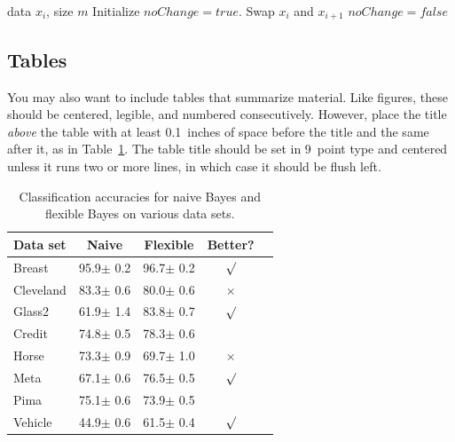 \documentclass{article}
\begin{document}
\begin{algorithm}[tb]
   \caption{Bubble Sort}
   \label{alg:example}
\begin{algorithmic}
    data $x_i$, size $m$
   \REPEAT
   \STATE Initialize $noChange = true$.
   \STATE Swap $x_i$ and $x_{i+1}$
   \STATE $noChange = false$
   \ENDIF
   \ENDFOR
\end{algorithmic}
\end{algorithm}

\subsection{Tables}

You may also want to include tables that summarize material. Like
figures, these should be centered, legible, and numbered consecutively.
However, place the title \emph{above} the table with at least
0.1~inches of space before the title and the same after it, as in
Table~\ref{sample-table}. The table title should be set in 9~point
type and centered unless it runs two or more lines, in which case it
should be flush left.


\begin{table}[t]
\caption{Classification accuracies for naive Bayes and flexible
Bayes on various data sets.}
\label{sample-table}
\vskip 0.15in
\begin{center}
\begin{small}
\begin{sc}
\begin{tabular}{lcccr}
\toprule
Data set & Naive & Flexible & Better? \\
\midrule
Breast    & 95.9$\pm$ 0.2& 96.7$\pm$ 0.2& $\surd$ \\
Cleveland & 83.3$\pm$ 0.6& 80.0$\pm$ 0.6& $\times$\\
Glass2    & 61.9$\pm$ 1.4& 83.8$\pm$ 0.7& $\surd$ \\
Credit    & 74.8$\pm$ 0.5& 78.3$\pm$ 0.6&         \\
Horse     & 73.3$\pm$ 0.9& 69.7$\pm$ 1.0& $\times$\\
Meta      & 67.1$\pm$ 0.6& 76.5$\pm$ 0.5& $\surd$ \\
Pima      & 75.1$\pm$ 0.6& 73.9$\pm$ 0.5&         \\
Vehicle   & 44.9$\pm$ 0.6& 61.5$\pm$ 0.4& $\surd$ \\
\bottomrule
\end{tabular}
\end{sc}
\end{small}
\end{center}
\vskip -0.1in
\end{table}
\end{document}
